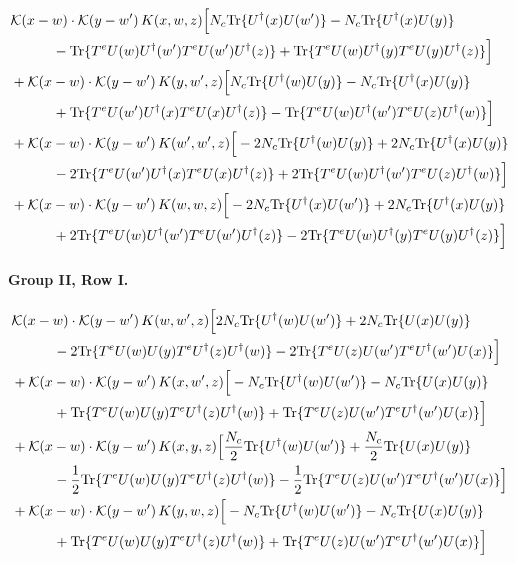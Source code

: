 \documentclass[10pt]{article}
\numberwithin{equation}{section}
\begin{document}
\begin{align}
&\mathcal K(x-w)\cdot\mathcal K(y-w')\,K(x,w,z)\Big[N_c{\rm Tr}\{U^\dagger(x)U(w')\}-N_c{\rm Tr}\{U^\dagger(x)U(y)\}\notag\\
&\quad\quad\quad-{\rm Tr}\{T^eU(w)U^\dagger(w')T^eU(w')U^\dagger(z)\}+{\rm Tr}\{T^eU(w)U^\dagger(y)T^eU(y)U^\dagger(z)\}\Big]\notag\\
&+\mathcal K(x-w)\cdot\mathcal K(y-w')\,K(y,w',z)\Big[N_c{\rm Tr}\{U^\dagger(w)U(y)\}-N_c{\rm Tr}\{U^\dagger(x)U(y)\}\notag\\
&\quad\quad\quad+{\rm Tr}\{T^eU(w')U^\dagger(x)T^eU(x)U^\dagger(z)\}-{\rm Tr}\{T^eU(w)U^\dagger(w')T^eU(z)U^\dagger(w)\}\Big]\notag\\
&+\mathcal K(x-w)\cdot\mathcal K(y-w')\,K(w',w',z)\Big[-2 N_c{\rm Tr}\{U^\dagger(w)U(y)\}+2 N_c{\rm Tr}\{U^\dagger(x)U(y)\}\notag\\
&\quad\quad\quad-2{\rm Tr}\{T^eU(w')U^\dagger(x)T^eU(x)U^\dagger(z)\}+2{\rm Tr}\{T^eU(w)U^\dagger(w')T^eU(z)U^\dagger(w)\}\Big]\notag\\
&+\mathcal K(x-w)\cdot\mathcal K(y-w')\,K(w,w,z)\Big[-2 N_c{\rm Tr}\{U^\dagger(x)U(w')\}+2 N_c{\rm Tr}\{U^\dagger(x)U(y)\}\notag\\
&\quad\quad\quad+2{\rm Tr}\{T^eU(w)U^\dagger(w')T^eU(w')U^\dagger(z)\}-2{\rm Tr}\{T^eU(w)U^\dagger(y)T^eU(y)U^\dagger(z)\}\Big]
\label{eq:list1}
\end{align}

\paragraph{Group II, Row I.}

\begin{align}
&\mathcal K(x-w)\cdot\mathcal K(y-w')\,K(w,w',z)\Big[2 N_c{\rm Tr}\{U^\dagger(w)U(w')\}+2 N_c{\rm Tr}\{U(x)U(y)\}\notag\\
&\quad\quad\quad-2{\rm Tr}\{T^eU(w)U(y)T^eU^\dagger(z)U^\dagger(w)\}-2{\rm Tr}\{T^eU(z)U(w')T^eU^\dagger(w')U(x)\}\Big]\notag\\
&+\mathcal K(x-w)\cdot\mathcal K(y-w')\,K(x,w',z)\Big[-N_c{\rm Tr}\{U^\dagger(w)U(w')\}-N_c{\rm Tr}\{U(x)U(y)\}\notag\\
&\quad\quad\quad+{\rm Tr}\{T^eU(w)U(y)T^eU^\dagger(z)U^\dagger(w)\}+{\rm Tr}\{T^eU(z)U(w')T^eU^\dagger(w')U(x)\}\Big]\notag\\
&+\mathcal K(x-w)\cdot\mathcal K(y-w')\,K(x,y,z)\Big[\frac{N_c}{2}{\rm Tr}\{U^\dagger(w)U(w')\}+\frac{N_c}{2}{\rm Tr}\{U(x)U(y)\}\notag\\
&\quad\quad\quad-\frac{1}{2}{\rm Tr}\{T^eU(w)U(y)T^eU^\dagger(z)U^\dagger(w)\}-\frac{1}{2}{\rm Tr}\{T^eU(z)U(w')T^eU^\dagger(w')U(x)\}\Big]\notag\\
&+\mathcal K(x-w)\cdot\mathcal K(y-w')\,K(y,w,z)\Big[-N_c{\rm Tr}\{U^\dagger(w)U(w')\}-N_c{\rm Tr}\{U(x)U(y)\}\notag\\
&\quad\quad\quad+{\rm Tr}\{T^eU(w)U(y)T^eU^\dagger(z)U^\dagger(w)\}+{\rm Tr}\{T^eU(z)U(w')T^eU^\dagger(w')U(x)\}\Big]
\label{eq:list2}
\end{align}
\end{document}
